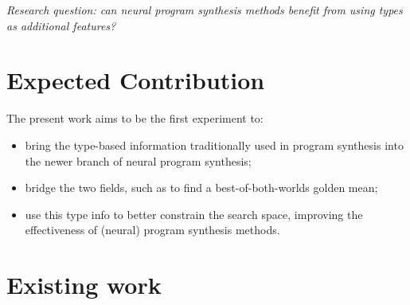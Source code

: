 \documentclass{article}
\begin{document}
\emph{Research question: can neural program synthesis methods benefit from using types as additional features?}

\section{Expected Contribution} %

The present work aims to be the first experiment to:
\begin{itemize}
    \item bring the type-based information traditionally used in program synthesis into the newer branch of neural program synthesis;
    \item bridge the two fields, such as to find a best-of-both-worlds golden mean;
    \item use this type info to better constrain the search space, improving the effectiveness of (neural) program synthesis methods. 
\end{itemize}

\section{Existing work} %
\end{document}
